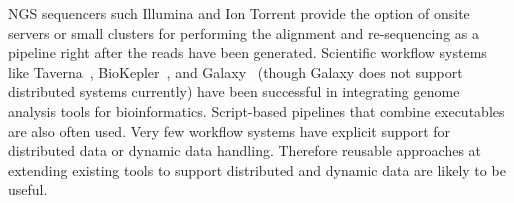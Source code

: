 %

NGS sequencers such Illumina and Ion Torrent provide the option of onsite
servers or small clusters for performing the alignment and re-sequencing as a
pipeline right after the reads have been generated.  Scientific workflow systems
like Taverna~\cite{Taverna:2006}, BioKepler~\cite{biokepler:2011}, and
Galaxy~\cite{galaxy} (though Galaxy does not support distributed systems
currently) have been successful in integrating genome analysis tools for
bioinformatics. Script-based pipelines that combine executables are also often
used. Very few workflow systems have explicit support for distributed data or
dynamic data handling.  Therefore reusable approaches at extending existing
tools to support distributed and dynamic data are likely to be useful.


%









